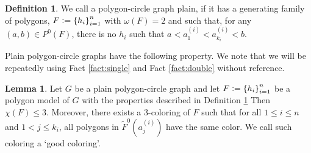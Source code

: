 \documentclass[12pt]{article}
\theoremstyle{definition}
\newtheorem{lemma}[thm]{Lemma}
\newtheorem{defn}[thm]{Definition}
\newcommand{\defeq}{\vcentcolon=}
\begin{document}
     \begin{defn} \label{def:plain}
         We call a polygon-circle graph plain,
         if it has a generating
         family of polygons,
         $F \defeq \left\{h_{i}\right\}_{i = 1}^{n}$ 
         with $\omega\left(F\right) = 2$
         and such that, 
         for any 
         $\left(a, b\right) \in 
         P^{0}\left(F\right)$,
         there is no $h_{i}$ 
         such that
         $a < a_1^{\left(i\right)} < 
         a_{k_{i}}^{\left(i\right)} <
         b$.
     \end{defn}

     Plain polygon-circle graphs have the
     following property. 
     We note that we will
     be repeatedly using
     Fact \ref{fact:single}
     and Fact \ref{fact:double}
     without reference.

     \begin{lemma} \label{lemma:poly}
         Let $G$ be a plain polygon-circle graph and
         let $F \defeq \left\{h_{i}\right\}_{i =1}^{n}$ 
         be a polygon model of $G$ with
         the properties
         described in Definition
         \ref{def:plain}
         Then $\chi\left(F\right) \leq 3$.
         Moreover, there exists
         a 3-coloring of $F$ such
         that for all $1 \leq i \leq n$
         and $1 < j \leq k_{i}$,
         all polygons in
         $\widetilde{F}^{0}\left(a_{j}^{\left(i\right)}\right)$
         have the same color.
         We call such coloring a
         `good coloring'.
     \end{lemma}
\end{document}

